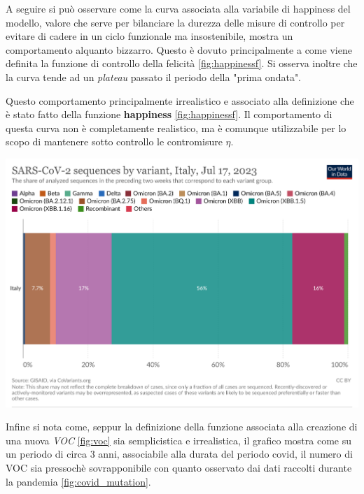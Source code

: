 A seguire si può osservare come la curva associata alla variabile di happiness del modello,
valore che serve per bilanciare la durezza delle misure di controllo per evitare 
di cadere in un ciclo funzionale ma insostenibile, mostra un comportamento alquanto bizzarro.
Questo è dovuto principalmente a come viene definita la funzione di controllo della felicità \ref{fig:happinessf}.
Si osserva inoltre che la curva tende ad un \emph{plateau} passato il periodo della "prima ondata".

Questo comportamento principalmente irrealistico e associato alla definizione che è stato fatto della 
funzione \textbf{happiness} \ref{fig:happinessf}. Il comportamento di questa curva non è completamente 
realistico, ma è comunque utilizzabile per lo scopo di mantenere sotto controllo le contromisure $\eta$.

\begin{minipage}{\linewidth}
	\centering
	\includegraphics[width=\textwidth]{img/coronavirus-data-explorer.png}
	\label{fig:covid_mutation}
\end{minipage}

Infine si nota come, seppur la definizione della funzione associata alla creazione di una
nuova \emph{VOC} \ref{fig:voc} sia semplicistica e irrealistica, il grafico mostra come 
su un periodo di circa 3 anni, associabile alla durata del periodo covid, 
il numero di VOC sia pressochè sovrapponibile con quanto osservato dai dati 
raccolti durante la pandemia \ref{fig:covid_mutation}. 
\newpage

